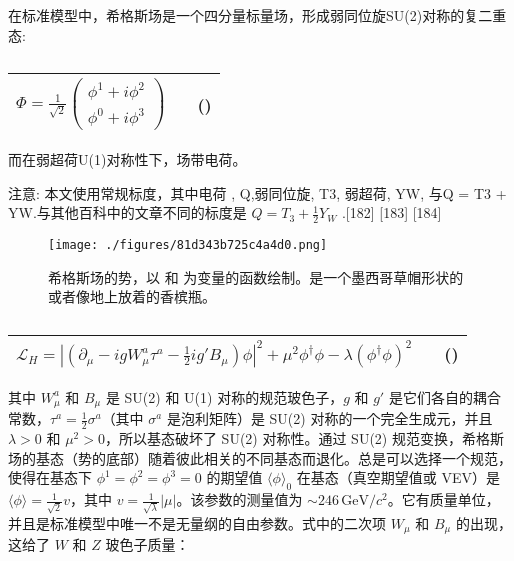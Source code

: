 在标准模型中，希格斯场是一个四分量标量场，形成弱同位旋SU(2)对称的复二重态:
\begin{table}[h]
\centering
\caption\label{tab_Higgs_2}
\begin{tabular}{|c|c|c|}
\hline
$\Phi = \frac{1}{\sqrt{2}} \left( \begin{array}{c}\phi^1 + i\phi^2 \\\phi^0 + i\phi^3\end{array} \right)$ & & () \\
\hline
\end{tabular}
\end{table}

而在弱超荷U(1)对称性下，场带电荷。

注意: 本文使用常规标度，其中电荷 , Q,弱同位旋, T3, 弱超荷, YW, 与Q = T3 + YW.与其他百科中的文章不同的标度是 $Q = T_3 + \frac{1}{2} Y_W$ .[182] [183] [184]

\begin{figure}[ht]
\centering
\texttt{[image: ./figures/81d343b725c4a4d0.png]}
\caption{希格斯场的势，以 和 为变量的函数绘制。是一个墨西哥草帽形状的或者像地上放着的香槟瓶。} \label{fig_Higgs_18}
\end{figure}

\begin{table}[h]
\centering
\caption\label{tab_Higgs_3}
\begin{tabular}{|c|c|c|}
\hline
$\mathcal{L}_H = \left| \left( \partial_\mu - ig W_\mu^a \tau^a - \frac{1}{2} ig' B_\mu \right) \phi \right|^2 + \mu^2 \phi^\dagger \phi - \lambda (\phi^\dagger \phi)^2$ & & () \\
\hline
\end{tabular}
\end{table}

其中 $W_\mu^a$ 和 $B_\mu$ 是 SU(2) 和 U(1) 对称的规范玻色子，$g$ 和 $g'$ 是它们各自的耦合常数，$\tau^a = \frac{1}{2} \sigma^a$（其中 $\sigma^a$ 是泡利矩阵）是 SU(2) 对称的一个完全生成元，并且 $\lambda > 0$ 和 $\mu^2 > 0$，所以基态破坏了 SU(2) 对称性。通过 SU(2) 规范变换，希格斯场的基态（势的底部）随着彼此相关的不同基态而退化。总是可以选择一个规范，使得在基态下 $\phi^1 = \phi^2 = \phi^3 = 0$ 的期望值 $\langle \phi \rangle_0$ 在基态（真空期望值或 VEV）是 $\langle \phi \rangle = \frac{1}{\sqrt{2}} v$，其中 $v = \frac{1}{\sqrt{\lambda}}|\mu|$。该参数的测量值为 $\sim 246 \, \text{GeV}/c^2$。它有质量单位，并且是标准模型中唯一不是无量纲的自由参数。式中的二次项 $W_\mu$ 和 $B_\mu$ 的出现，这给了 $W$ 和 $Z$ 玻色子质量：